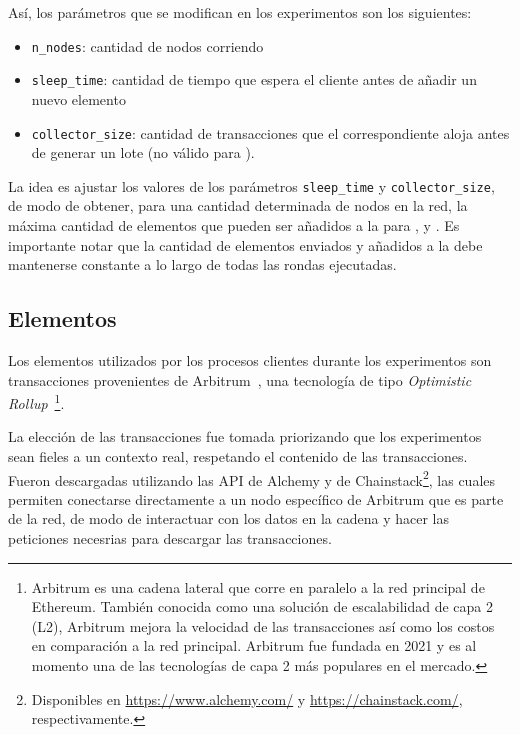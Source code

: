 Así, los parámetros que se modifican en los experimentos son los siguientes:
\begin{itemize}
	\item \texttt{n\_nodes}: cantidad de nodos corriendo
	\item \texttt{sleep\_time}: cantidad de tiempo que espera el cliente antes de añadir un nuevo elemento
	\item \texttt{collector\_size}: cantidad de transacciones que el correspondiente \collector aloja antes de generar
	un lote (no válido para \vanilla).
\end{itemize}
La idea es ajustar los valores de los parámetros \texttt{sleep\_time} y \texttt{collector\_size},
de modo de obtener, para una cantidad determinada de nodos en la red, la máxima cantidad de elementos que pueden ser
añadidos a la \setchain para \vanilla, \compresschain y \hashchain.
Es importante notar que la cantidad de elementos enviados y añadidos a la \setchain debe mantenerse constante a lo largo
de todas las rondas ejecutadas.


\subsection{Elementos}
Los elementos utilizados por los procesos clientes durante los experimentos son transacciones provenientes
de Arbitrum~\cite{Kalodner2018Arbitrum}, una tecnología de tipo \textit{Optimistic Rollup}~\footnote{
Arbitrum es una cadena lateral que corre en paralelo a la red principal de Ethereum.
También conocida como una solución de escalabilidad de capa 2 (L2), Arbitrum mejora la velocidad de las transacciones así
como los costos en comparación a la red principal.
Arbitrum fue fundada en 2021 y es al momento una de las tecnologías de capa 2 más populares en el mercado.}.
%

La elección de las transacciones fue tomada priorizando que los experimentos sean fieles a un contexto
real, respetando el contenido de las transacciones.
%
Fueron descargadas utilizando las API de Alchemy y de Chainstack\footnote{Disponibles en \url{https://www.alchemy.com/} y \url{https://chainstack.com/},
respectivamente.}, las
cuales permiten conectarse directamente a un nodo específico de Arbitrum que es parte de la red,
de modo de interactuar con los datos en la cadena y hacer las peticiones necesrias para descargar las transacciones.

